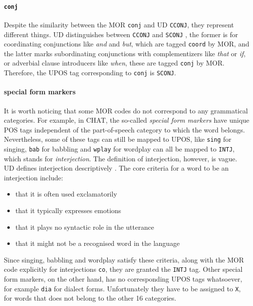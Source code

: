 \paragraph{\texttt{conj}}
Despite the similarity between the MOR \texttt{conj} and UD \texttt{CCONJ}, they represent different things. UD distinguishes between \texttt{CCONJ}  and \texttt{SCONJ} , the former is for coordinating conjunctions like \emph{and} and \emph{but}, which are tagged \texttt{coord} by MOR, and the latter marks subordinating conjunctions with complementizers like \emph{that} or \emph{if}, or adverbial clause introducers like \emph{when}, these are tagged \texttt{conj} by MOR. Therefore, the UPOS tag corresponding to \texttt{conj} is \texttt{SCONJ}.

\paragraph{special form markers}
It is worth noticing that some MOR codes do not correspond to any grammatical categories. For example, in CHAT, the so-called \emph{special form markers} have unique POS tags independent of the part-of-speech category to which the word belongs. Nevertheless, some of these tags can still be mapped to UPOS, like \texttt{sing} for singing, \texttt{bab} for babbling and \texttt{wplay} for wordplay can all be mapped to \texttt{INTJ}, which stands for \emph{interjection}. The definition of interjection, however, is vague. UD defines interjection descriptively . The core criteria for a word  to be an interjection include:
\begin{itemize}
    \item that it is often used exclamatorily
    \item that it typically expresses emotions
    \item that it plays no syntactic role in the utterance
    \item that it might not be a recognised word in the language
\end{itemize}
Since singing, babbling and wordplay satisfy these criteria, along with the MOR code explicitly for interjections \texttt{co}, they are granted the \texttt{INTJ} tag. Other special form markers, on the other hand, has no corresponding UPOS tags whatsoever, for example \texttt{dia} for dialect forms. Unfortunately they have to be assigned to \texttt{X}, for words that does not belong to the other 16 categories.

